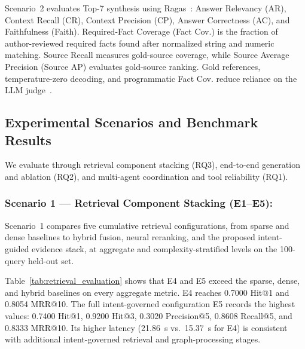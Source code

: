Scenario~2 evaluates Top-7 synthesis using Ragas~\cite{es2023ragas}: Answer Relevancy (AR), Context Recall (CR), Context Precision (CP), Answer Correctness (AC), and Faithfulness (Faith). Required-Fact Coverage (Fact Cov.) is the fraction of author-reviewed required facts found after normalized string and numeric matching. Source Recall measures gold-source coverage, while Source Average Precision (Source AP) evaluates gold-source ranking. Gold references, temperature-zero decoding, and programmatic Fact Cov. reduce reliance on the LLM judge~\cite{zheng2023judging,es2023ragas}.

\subsection{Experimental Scenarios and Benchmark Results}
\label{sec:scenarios}

We evaluate \system{} through retrieval component stacking (RQ3), end-to-end generation and ablation (RQ2), and multi-agent coordination and tool reliability (RQ1).

\subsubsection{Scenario 1 --- Retrieval Component Stacking (E1--E5):}
Scenario~1 compares five cumulative retrieval configurations, from sparse and dense baselines to hybrid fusion, neural reranking, and the proposed intent-guided evidence stack, at aggregate and complexity-stratified levels on the 100-query held-out set.

Table~\ref{tab:retrieval_evaluation} shows that E4 and E5 exceed the sparse, dense, and hybrid baselines on every aggregate metric. E4 reaches 0.7000 Hit@1 and 0.8054 MRR@10. The full intent-governed configuration E5 records the highest values: 0.7400 Hit@1, 0.9200 Hit@3, 0.3020 Precision@5, 0.8608 Recall@5, and 0.8333 MRR@10. Its higher latency (21.86~s vs.\ 15.37~s for E4) is consistent with additional intent-governed retrieval and graph-processing stages.

